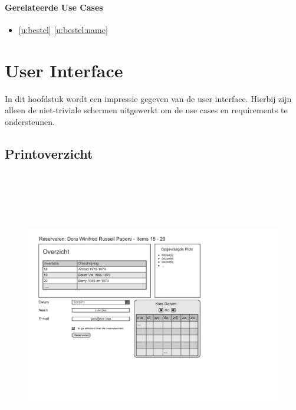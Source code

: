 \documentclass[a4paper,titlepage]{report}
\makeatletter
\def\namedlabel#1#2{
  \label{#1}
  \begingroup
   \def\@currentlabel{#2}%
   \label{#1:name}\endgroup
}
\def\namedref#1{\ref{#1} \ref{#1:name}}
\makeatother
\begin{document}
      \subsubsection{Gerelateerde Use Cases}
        \begin{itemize}
          \item \namedref{u:bestel}
        \end{itemize}

\chapter{User Interface}
\label{chap:ui_mock}
In dit hoofdstuk wordt een impressie gegeven van de user interface. Hierbij
zijn alleen de niet-triviale schermen uitgewerkt om de use cases en
requirements te ondersteunen.

\section{Printoverzicht}
\namedlabel{ui:print-overzicht}{Printoverzicht}
\begin{figure}[H]
  \includegraphics[height=130mm,page=4]{ui.pdf}
\end{figure}
\end{document}
